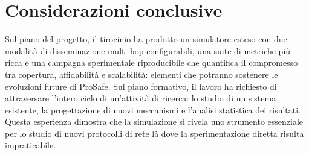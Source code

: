 \section{Considerazioni conclusive}
\label{sec:concl-finale}
Sul piano del progetto, il tirocinio ha prodotto un
simulatore esteso con due modalit\`a di disseminazione multi-hop
configurabili, una suite di metriche pi\`u ricca e una campagna sperimentale
riproducibile che quantifica il compromesso tra copertura, affidabilit\`a e
scalabilit\`a: elementi che potranno sostenere le evoluzioni future di
ProSafe. Sul piano formativo, il lavoro ha richiesto di attraversare l'intero
ciclo di un'attivit\`a di ricerca: lo studio di un sistema esistente, la
progettazione di nuovi meccanismi e l'analisi statistica dei
risultati. Questa esperienza dimostra che la simulazione si rivela uno strumento essenziale per lo studio
di nuovi protocolli di rete l\`a dove la sperimentazione diretta risulta impraticabile.
